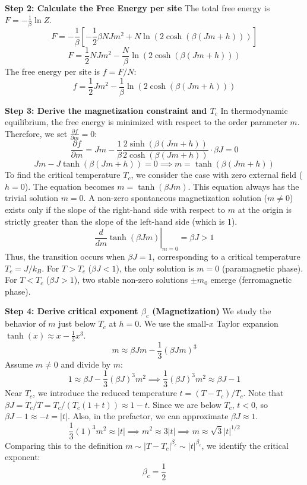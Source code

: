 \begin{solution}
\textbf{Step 2: Calculate the Free Energy per site}
The total free energy is $F = -\frac{1}{\beta} \ln Z$.
\[ F = -\frac{1}{\beta} \left[ -\frac{1}{2} \beta N J m^2 + N \ln(2 \cosh(\beta(Jm+h))) \right] \]
\[ F = \frac{1}{2} N J m^2 - \frac{N}{\beta} \ln(2 \cosh(\beta(Jm+h))) \]
The free energy per site is $f = F / N$:
\[ f = \frac{1}{2} J m^2 - \frac{1}{\beta} \ln(2 \cosh(\beta(Jm+h))) \]

\textbf{Step 3: Derive the magnetization constraint and $T_c$}
In thermodynamic equilibrium, the free energy is minimized with respect to the order parameter $m$. Therefore, we set $\frac{\partial f}{\partial m} = 0$:
\[ \frac{\partial f}{\partial m} = J m - \frac{1}{\beta} \frac{2 \sinh(\beta(Jm+h))}{2 \cosh(\beta(Jm+h))} \cdot \beta J = 0 \]
\[ J m - J \tanh(\beta(Jm+h)) = 0 \implies m = \tanh(\beta(Jm+h)) \]
To find the critical temperature $T_c$, we consider the case with zero external field ($h = 0$). The equation becomes $m = \tanh(\beta J m)$.
This equation always has the trivial solution $m = 0$.
A non-zero spontaneous magnetization solution ($m \neq 0$) exists only if the slope of the right-hand side with respect to $m$ at the origin is strictly greater than the slope of the left-hand side (which is 1).
\[ \left. \frac{d}{dm} \tanh(\beta J m) \right|_{m=0} = \beta J > 1 \]
Thus, the transition occurs when $\beta J = 1$, corresponding to a critical temperature $T_c = J / k_B$.
For $T > T_c$ ($\beta J < 1$), the only solution is $m=0$ (paramagnetic phase).
For $T < T_c$ ($\beta J > 1$), two stable non-zero solutions $\pm m_0$ emerge (ferromagnetic phase).

\textbf{Step 4: Derive critical exponent $\beta_c$ (Magnetization)}
We study the behavior of $m$ just below $T_c$ at $h=0$. We use the small-$x$ Taylor expansion $\tanh(x) \approx x - \frac{1}{3}x^3$.
\[ m \approx \beta J m - \frac{1}{3}(\beta J m)^3 \]
Assume $m \neq 0$ and divide by $m$:
\[ 1 \approx \beta J - \frac{1}{3}(\beta J)^3 m^2 \implies \frac{1}{3}(\beta J)^3 m^2 \approx \beta J - 1 \]
Near $T_c$, we introduce the reduced temperature $t = (T - T_c) / T_c$. Note that $\beta J = T_c / T = T_c / (T_c(1+t)) \approx 1 - t$.
Since we are below $T_c$, $t < 0$, so $\beta J - 1 \approx -t = |t|$.
Also, in the prefactor, we can approximate $\beta J \approx 1$.
\[ \frac{1}{3} (1)^3 m^2 \approx |t| \implies m^2 \approx 3|t| \implies m \approx \sqrt{3} |t|^{1/2} \]
Comparing this to the definition $m \sim |T - T_c|^{\beta_c} \sim |t|^{\beta_c}$, we identify the critical exponent:
\[ \beta_c = \frac{1}{2} \]


\end{solution}
